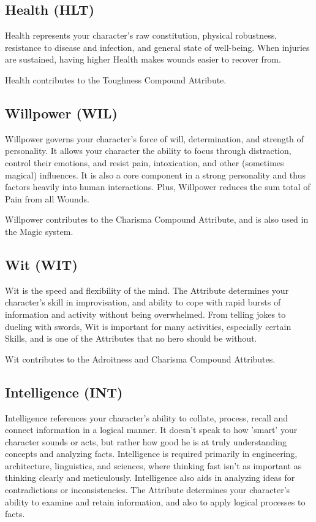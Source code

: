 \documentclass[oneside,11pt,english]{book}
\begin{document}
\subsection*{Health (HLT)}
Health represents your character's raw constitution, physical robustness, resistance to disease and 
infection, and general state of well-being. When injuries are sustained, having higher Health makes 
wounds easier to recover from. 


Health contributes to the Toughness Compound Attribute. 
\subsection*{Willpower (WIL)}
Willpower governs your character’s force of will, determination, and strength of personality. 
It allows your character the ability to focus through distraction, control their emotions, and resist pain, 
intoxication, and other (sometimes magical) influences. It is also a core component in a strong personality 
and thus factors heavily into human interactions. Plus, Willpower reduces the sum total of Pain from all 
Wounds. 

 
Willpower contributes to the Charisma Compound Attribute, and is also used in the Magic system. 
\subsection*{Wit (WIT)}
Wit is the speed and flexibility of the mind. The Attribute determines your character’s skill in 
improvisation, and ability to cope with rapid bursts of information and activity without being 
overwhelmed. From telling jokes to dueling with swords, Wit is important for many activities, especially 
certain Skills, and is one of the Attributes that no hero should be without. 

 
Wit contributes to the Adroitness and Charisma Compound Attributes. 
\subsection*{Intelligence (INT)}
Intelligence references your character's ability to collate, process, recall and connect information in a 
logical manner. It doesn’t speak to how 'smart' your character sounds or acts, but rather how good he is at 
truly understanding concepts and analyzing facts. Intelligence is required primarily in engineering, 
architecture, linguistics, and sciences, where thinking fast isn't as important as thinking clearly and 
meticulously. Intelligence also aids in analyzing ideas for contradictions or inconsistencies. The Attribute 
determines your character’s ability to examine and retain information, and also to apply logical processes 
to facts. 
 
\end{document}
